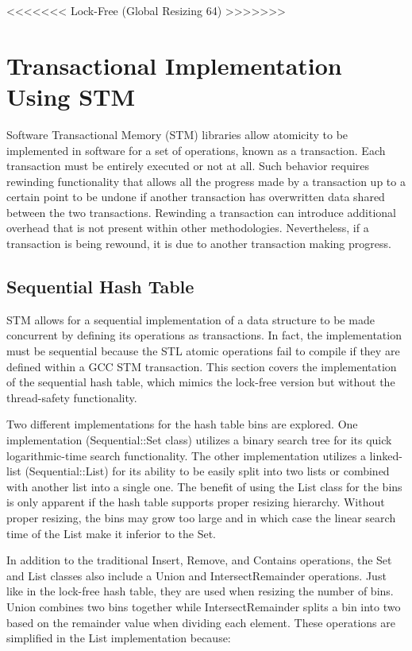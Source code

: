 \documentclass[11pt]{article} %
\begin{document}
<<<<<<< Lock-Free (Global Resizing 64) >>>>>>>


\section{Transactional Implementation Using STM}

Software Transactional Memory (STM) libraries allow atomicity to be implemented in software for a set of operations, known as a transaction. Each transaction must be entirely executed or not at all. Such behavior requires rewinding functionality that allows all the progress made by a transaction up to a certain point to be undone if another transaction has overwritten data shared between the two transactions. Rewinding a transaction can introduce additional overhead that is not present within other methodologies. Nevertheless, if a transaction is being rewound, it is due to another transaction making progress.

\subsection{Sequential Hash Table}

STM allows for a sequential implementation of a data structure to be made concurrent by defining its operations as transactions. In fact, the implementation must be sequential because the STL atomic operations fail to compile if they are defined within a GCC STM transaction. This section covers the implementation of the sequential hash table, which mimics the lock-free version but without the thread-safety functionality.

Two different implementations for the hash table bins are explored. One implementation (Sequential::Set class) utilizes a binary search tree for its quick logarithmic-time search functionality. The other implementation utilizes a linked-list (Sequential::List) for its ability to be easily split into two lists or combined with another list into a single one. The benefit of using the List class for the bins is only apparent if the hash table supports proper resizing hierarchy. Without proper resizing, the bins may grow too large and in which case the linear search time of the List make it inferior to the Set.

In addition to the traditional Insert, Remove, and Contains operations, the Set and List classes also include a Union and IntersectRemainder operations. Just like in the lock-free hash table, they are used when resizing the number of bins. Union combines two bins together while IntersectRemainder splits a bin into two based on the remainder value when dividing each element. These operations are simplified in the List implementation because:
\end{document}
